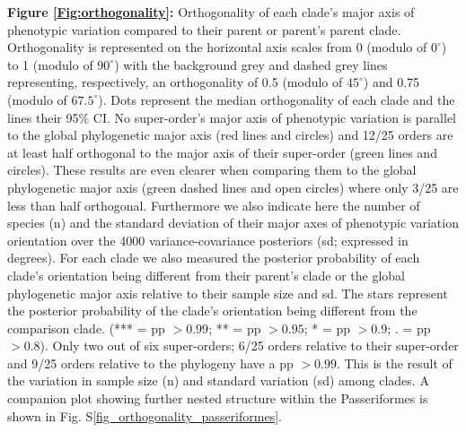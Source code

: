 \documentclass[12pt,letterpaper]{article}
\begin{document}
\bigskip

\noindent \textbf{Figure \ref{Fig:orthogonality}:}
Orthogonality of each clade's major axis of phenotypic variation compared to their parent or parent's parent clade.
Orthogonality is represented on the horizontal axis scales from 0 (modulo of $0^\circ$) to 1 (modulo of $90^\circ$) with the background grey and dashed grey lines representing, respectively, an orthogonality of 0.5 (modulo of $45^\circ$) and 0.75 (modulo of $67.5^\circ$).
Dots represent the median orthogonality of each clade and the lines their 95\% CI.
No super-order's major axis of phenotypic variation is parallel to the global phylogenetic major axis (red lines and circles) and 12/25 orders are at least half orthogonal to the major axis of their super-order (green lines and circles).
These results are even clearer when comparing them to the global phylogenetic major axis (green dashed lines and open circles) where only 3/25 are less than half orthogonal.
Furthermore we also indicate here the number of species (n) and the standard deviation of their major axes of phenotypic variation orientation over the 4000 variance-covariance posteriors (sd; expressed in degrees).
For each clade we also measured the posterior probability of each clade's orientation being different from their parent's clade or the global phylogenetic major axis relative to their sample size and sd.
The stars represent the posterior probability of the clade's orientation being different from the comparison clade. (*** = pp $> 0.99$; ** = pp $>0.95$; * = pp $> 0.9$; . = pp $> 0.8$).
Only two out of six super-orders; 6/25 orders relative to their super-order and 9/25 orders relative to the phylogeny have a pp $> 0.99$.
This is the result of the variation in sample size (n) and standard variation (sd) among clades. 
A companion plot showing further nested structure within the Passeriformes is shown in Fig. S\ref{fig_orthogonality_passeriformes}.

\bigskip
\end{document}
